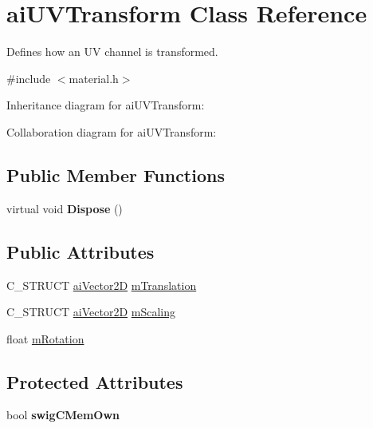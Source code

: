 \hypertarget{structai_u_v_transform}{\section{ai\+U\+V\+Transform Class Reference}
\label{structai_u_v_transform}
}


Defines how an U\+V channel is transformed.  




{\ttfamily \#include $<$material.\+h$>$}



Inheritance diagram for ai\+U\+V\+Transform\+:


Collaboration diagram for ai\+U\+V\+Transform\+:
\subsection*{Public Member Functions}
\begin{DoxyCompactItemize}
\item 
\hypertarget{structai_u_v_transform_ad33e8880c044eeae16bb0c2fbd568017}{virtual void {\bfseries Dispose} ()}\label{structai_u_v_transform_ad33e8880c044eeae16bb0c2fbd568017}

\end{DoxyCompactItemize}
\subsection*{Public Attributes}
\begin{DoxyCompactItemize}
\item 
C\+\_\+\+S\+T\+R\+U\+C\+T \hyperlink{structai_vector2_d}{ai\+Vector2\+D} \hyperlink{structai_u_v_transform_a8c7f35959aa342bf0cef670246fbb813}{m\+Translation}
\item 
C\+\_\+\+S\+T\+R\+U\+C\+T \hyperlink{structai_vector2_d}{ai\+Vector2\+D} \hyperlink{structai_u_v_transform_a89429a027cbf914e7212e48149a957c8}{m\+Scaling}
\item 
float \hyperlink{structai_u_v_transform_aa8dcf39ccd39f786b3f5f163bd663792}{m\+Rotation}
\end{DoxyCompactItemize}
\subsection*{Protected Attributes}
\begin{DoxyCompactItemize}
\item 
\hypertarget{structai_u_v_transform_a61c94ff744a714f7f05570abca4fd605}{bool {\bfseries swig\+C\+Mem\+Own}}\label{structai_u_v_transform_a61c94ff744a714f7f05570abca4fd605}

\end{DoxyCompactItemize}
